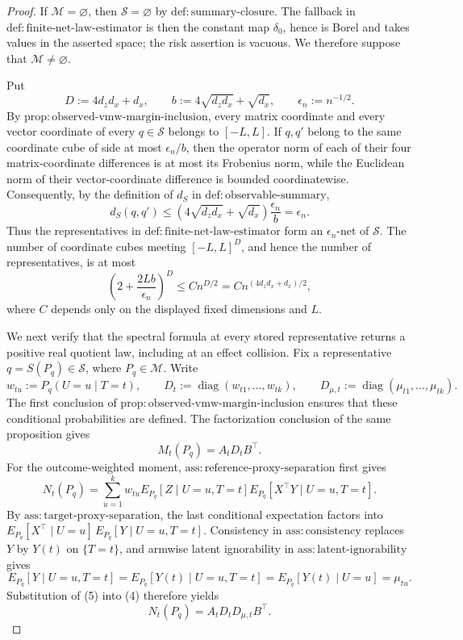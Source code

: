 \documentclass{article}
\begin{document}
\begin{proof}
If \(\mathcal M=\varnothing\), then \(\mathscr S=\varnothing\) by \(\mathrm{def:summary\text{-}closure}\).  The fallback in \(\mathrm{def:finite\text{-}net\text{-}law\text{-}estimator}\) is then the constant map \(\delta_0\), hence is Borel and takes values in the asserted space; the risk assertion is vacuous.  We therefore suppose that \(\mathcal M\ne\varnothing\).

Put
\[
D:=4d_zd_x+d_x,\qquad b:=4\sqrt{d_zd_x}+\sqrt{d_x},\qquad \epsilon_n:=n^{-1/2}.
\]
By \(\mathrm{prop:observed\text{-}vmw\text{-}margin\text{-}inclusion}\), every matrix coordinate and every vector coordinate of every \(q\in\mathscr S\) belongs to \([-L,L]\).  If \(q,q'\) belong to the same coordinate cube of side at most \(\epsilon_n/b\), then the operator norm of each of their four matrix-coordinate differences is at most its Frobenius norm, while the Euclidean norm of their vector-coordinate difference is bounded coordinatewise.  Consequently, by the definition of \(d_S\) in \(\mathrm{def:observable\text{-}summary}\),
\[
d_S(q,q')
 \le \left(4\sqrt{d_zd_x}+\sqrt{d_x}\right)\frac{\epsilon_n}{b}
 =\epsilon_n. \tag{1}
\]
Thus the representatives in \(\mathrm{def:finite\text{-}net\text{-}law\text{-}estimator}\) form an \(\epsilon_n\)-net of \(\mathscr S\).  The number of coordinate cubes meeting \([-L,L]^D\), and hence the number of representatives, is at most
\[
\left(2+\frac{2Lb}{\epsilon_n}\right)^D
 \le C n^{D/2}
 =C n^{(4d_zd_x+d_x)/2}, \tag{2}
\]
where \(C\) depends only on the displayed fixed dimensions and \(L\).

We next verify that the spectral formula at every stored representative returns a positive real quotient law, including at an effect collision.  Fix a representative \(q=S(P_q)\in\mathscr S\), where \(P_q\in\mathcal M\).  Write
\[
w_{tu}:=P_q(U=u\mid T=t),\qquad
D_t:=\operatorname{diag}(w_{t1},\ldots,w_{tk}),\qquad
D_{\mu,t}:=\operatorname{diag}(\mu_{t1},\ldots,\mu_{tk}).
\]
The first conclusion of \(\mathrm{prop:observed\text{-}vmw\text{-}margin\text{-}inclusion}\) ensures that these conditional probabilities are defined.  The factorization conclusion of the same proposition gives
\[
M_t(P_q)=A_tD_tB^\top. \tag{3}
\]
For the outcome-weighted moment, \(\mathrm{ass:reference\text{-}proxy\text{-}separation}\) first gives
\[
N_t(P_q)
=\sum_{u=1}^k w_{tu}E_{P_q}[Z\mid U=u,T=t]
 E_{P_q}[X^\top Y\mid U=u,T=t]. \tag{4}
\]
By \(\mathrm{ass:target\text{-}proxy\text{-}separation}\), the last conditional expectation factors into \(E_{P_q}[X^\top\mid U=u]\,E_{P_q}[Y\mid U=u,T=t]\).  Consistency in \(\mathrm{ass:consistency}\) replaces \(Y\) by \(Y(t)\) on \(\{T=t\}\), and armwise latent ignorability in \(\mathrm{ass:latent\text{-}ignorability}\) gives
\[
E_{P_q}[Y\mid U=u,T=t]
=E_{P_q}[Y(t)\mid U=u,T=t]
=E_{P_q}[Y(t)\mid U=u]
=\mu_{tu}. \tag{5}
\]
Substitution of (5) into (4) therefore yields
\[
N_t(P_q)=A_tD_tD_{\mu,t}B^\top. \tag{6}
\]


\end{proof}
\end{document}
